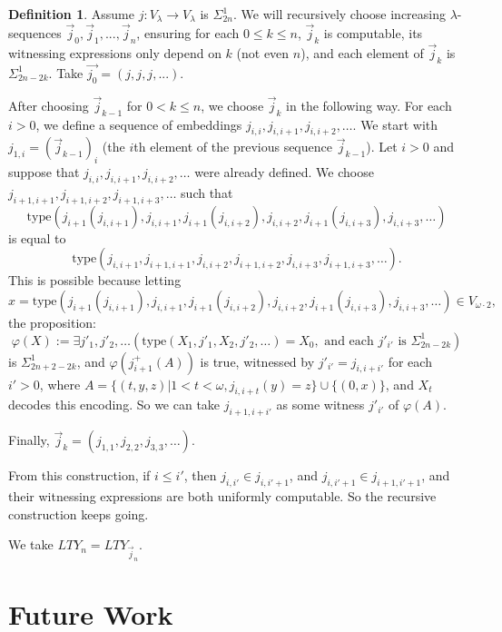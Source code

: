 \documentclass{article}
\theoremstyle{definition}
\newtheorem{definition}[lemma]{Definition}
\theoremstyle{remark}
\begin{document}
\begin{definition}
    Assume $j:V_\lambda\rightarrow V_\lambda$ is $\Sigma^1_{2n}$. We will recursively choose increasing $\lambda$-sequences $\vec{j}_0,\vec{j}_1,...,\vec{j}_n$, ensuring for each $0\le k\le n$, $\vec{j}_{k}$ is computable, its witnessing expressions only depend on $k$ (not even $n$), and each element of $\vec{j}_{k}$ is $\Sigma^1_{2n-2k}$. Take $\vec{j_0}=(j,j,j,...)$.

    After choosing $\vec{j}_{k-1}$ for $0<k\le n$, we choose $\vec{j}_{k}$ in the following way. For each $i>0$, we define a sequence of embeddings $j_{i,i}, j_{i,i+1}, j_{i,i+2},\dots$. 
    We start with $j_{1,i}=(\vec{j}_{k-1})_i$ (the $i$th element of the previous sequence $\vec{j}_{k-1}$). Let $i>0$ and suppose that $j_{i,i},j_{i,i+1},j_{i,i+2},\dots$ were already defined. We choose $j_{i+1,i+1},j_{i+1,i+2},j_{i+1,i+3},\dots$ such that 
    \[
    \mathrm{type}(j_{i+1}(j_{i,i+1}),j_{i,i+1},j_{i+1}(j_{i,i+2}),j_{i,i+2},j_{i+1}(j_{i,i+3}),j_{i,i+3},\dots)
    \] 
    is equal to 
    \[
    \mathrm{type}(j_{i,i+1},j_{i+1,i+1},j_{i,i+2},j_{i+1,i+2},j_{i,i+3},j_{i+1,i+3},\dots).
    \] 
    This is possible because letting  
    \[ x=\mathrm{type}(j_{i+1}(j_{i,i+1}),j_{i,i+1},j_{i+1}(j_{i,i+2}),j_{i,i+2},j_{i+1}(j_{i,i+3}),j_{i,i+3},\dots)\in V_{\omega\cdot 2},
    \] 
    the proposition:
      \[
      \varphi(X):=\exists j'_1,j'_2,\dots(\mathrm{type}(X_1,j'_1,X_2,j'_2,\dots)=X_0, \text{ and each }j'_{i'}\text{ is }\Sigma^1_{2n-2k})
      \]
       is $\Sigma^1_{2n+2-2k}$, and $\varphi(j_{i+1}^+(A))$ is true, witnessed by $j'_{i'}=j_{i,i+i'}$ for each $i'>0$, where $A=\{(t,y,z)|1<t<\omega, j_{i,i+t}(y)=z\}\cup \{(0,x)\}$, and $X_t$ decodes this encoding. So we can take $j_{i+1,i+i'}$ as some witness $j'_{i'}$ of $\varphi(A)$. 

    Finally, $\vec{j}_k=(j_{1,1},j_{2,2},j_{3,3},\dots)$.

    From this construction, if $i\le i'$, then $j_{i,i'}\in j_{i,i'+1}$, and $j_{i,i'+1}\in j_{i+1,i'+1}$, and their witnessing expressions are both uniformly computable. So the recursive construction keeps going.

    We take $LTY_n=LTY_{\vec{j}_n}$. 
\end{definition}


\section{Future Work}
\label{sec:future_work}
\end{document}
